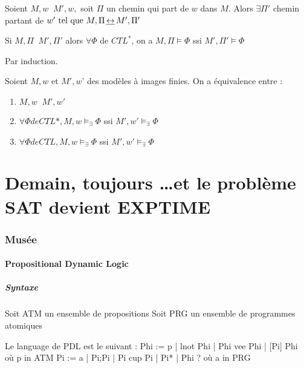 \documentclass[10pt,a4paper]{article}
\DeclareMathOperator{\bisim}{\underline{\leftrightarrow}}
\begin{document}
\begin{prop}
 Soient $M, w \bisim M',w,$ soit $\Pi$ un chemin qui part de $w$ dans $M$.
 Alors $\exists \Pi'$ chemin partant de $w' \tq M, \Pi \bisim M', \Pi'$
\end{prop}
\begin{dem}
 
\end{dem}
\begin{prop}
 Si $M,\Pi \bisim M', \Pi'$ alors $\forall \Phi$ de $CTL^*$, on a 
$M, \Pi \models \Phi$ ssi $M', \Pi' \models \Phi$
\end{prop}
\begin{dem}
 Par induction.
\end{dem}
\begin{thm}
 Soient $M,w$ et $M', w$' des modèles à images finies.
On a équivalence entre :
  \begin{enumerate}
   \item $M, w \bisim M', w'$
   \item $\forall \Phi de CTL*, M,w \models_\exists \Phi$ ssi $M', w' \models_\exists \Phi$
   \item $\forall \Phi de CTL, M,w \models_\exists \Phi$ ssi $M', w' \models_\exists \Phi$
  \end{enumerate}

\end{thm}


\part{Demain, toujours \dots et le problème SAT devient EXPTIME}

\section{Musée}

\subsection{Propositional Dynamic Logic}

\subsubsection{Syntaxe}
Soit ATM un ensemble de propositions
Soit PRG un ensemble de programmes atomiques

Le language de PDL est le suivant : 
 Phi := p | lnot Phi | Phi vee Phi | [Pi] Phi		où p in ATM
 Pi := a | Pi;Pi | Pi cup Pi | Pi* | Phi ?		où a in PRG
\end{document}
